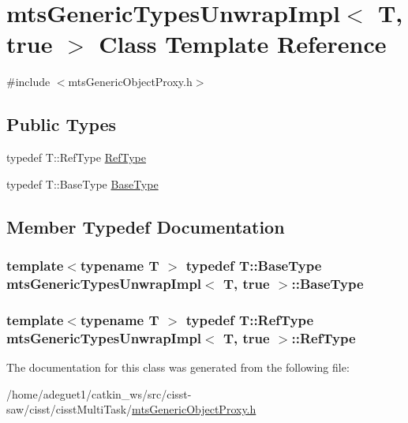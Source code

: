 \hypertarget{classmts_generic_types_unwrap_impl_3_01_t_00_01true_01_4}{\section{mts\-Generic\-Types\-Unwrap\-Impl$<$ T, true $>$ Class Template Reference}
\label{classmts_generic_types_unwrap_impl_3_01_t_00_01true_01_4}
}


{\ttfamily \#include $<$mts\-Generic\-Object\-Proxy.\-h$>$}

\subsection*{Public Types}
\begin{DoxyCompactItemize}
\item 
typedef T\-::\-Ref\-Type \hyperlink{classmts_generic_types_unwrap_impl_3_01_t_00_01true_01_4_a9b39b8e29d3c298535f6ee83a35efcbf}{Ref\-Type}
\item 
typedef T\-::\-Base\-Type \hyperlink{classmts_generic_types_unwrap_impl_3_01_t_00_01true_01_4_aedbee707f9f89610f54c66939bb5ebe5}{Base\-Type}
\end{DoxyCompactItemize}


\subsection{Member Typedef Documentation}
\hypertarget{classmts_generic_types_unwrap_impl_3_01_t_00_01true_01_4_aedbee707f9f89610f54c66939bb5ebe5}{
\subsubsection[{Base\-Type}]{\setlength{\rightskip}{0pt plus 5cm}template$<$typename T $>$ typedef T\-::\-Base\-Type {\bf mts\-Generic\-Types\-Unwrap\-Impl}$<$ T, true $>$\-::{\bf Base\-Type}}}\label{classmts_generic_types_unwrap_impl_3_01_t_00_01true_01_4_aedbee707f9f89610f54c66939bb5ebe5}
\hypertarget{classmts_generic_types_unwrap_impl_3_01_t_00_01true_01_4_a9b39b8e29d3c298535f6ee83a35efcbf}{
\subsubsection[{Ref\-Type}]{\setlength{\rightskip}{0pt plus 5cm}template$<$typename T $>$ typedef T\-::\-Ref\-Type {\bf mts\-Generic\-Types\-Unwrap\-Impl}$<$ T, true $>$\-::{\bf Ref\-Type}}}\label{classmts_generic_types_unwrap_impl_3_01_t_00_01true_01_4_a9b39b8e29d3c298535f6ee83a35efcbf}


The documentation for this class was generated from the following file\-:\begin{DoxyCompactItemize}
\item 
/home/adeguet1/catkin\-\_\-ws/src/cisst-\/saw/cisst/cisst\-Multi\-Task/\hyperlink{mts_generic_object_proxy_8h}{mts\-Generic\-Object\-Proxy.\-h}\end{DoxyCompactItemize}
